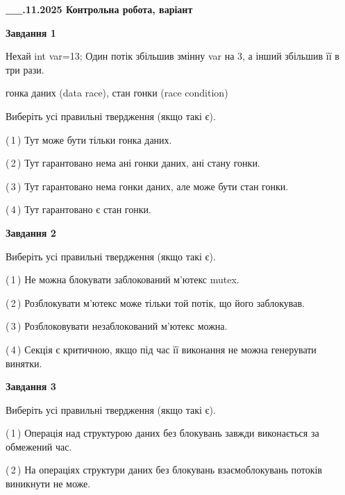 \documentclass[12pt, ukrainian]{article}
\begin{document}
\begin {large}

\textbf{\_\_.11.2025 Контрольна робота, варіант  }\par


{

\begin{center}
\textbf{Завдання 1}
\end{center}
Нехай int var=13; Один потік збільшив змінну var на 3, а інший збільшив її в три рази.

гонка даних (data race), стан гонки (race condition)

Виберіть усі правильні твердження (якщо такі є).\par
\vspace{2mm}
(\,1\,) Тут може бути тільки гонка даних.%

(\,2\,) Тут гарантовано нема ані гонки даних, ані стану гонки.%

(\,3\,) Тут гарантовано нема гонки даних, але може бути стан гонки.%

(\,4\,) Тут гарантовано є стан гонки.%



\begin{center}
\textbf{Завдання 2}
\end{center}
Виберіть усі правильні твердження (якщо такі є).\par
\vspace{2mm}

(\,1\,) Не можна блокувати заблокований м’ютекс mutex.%

(\,2\,) Розблокувати м’ютекс може тільки той потік, що його заблокував.%

(\,3\,) Розблоковувати незаблокований м’ютекс можна.%

(\,4\,) Секція є критичною, якщо під час її виконання не можна генерувати винятки.%



\begin{center}
\textbf{Завдання 3}
\end{center}
Виберіть усі правильні твердження (якщо такі є).\par
\vspace{2mm}

(\,1\,) Операція над структурою даних без блокувань завжди виконається за обмежений час.%

(\,2\,) На операціях структури даних без блокувань взаємоблокувань потоків виникнути не може.%

}
\end{large}
\end{document}
